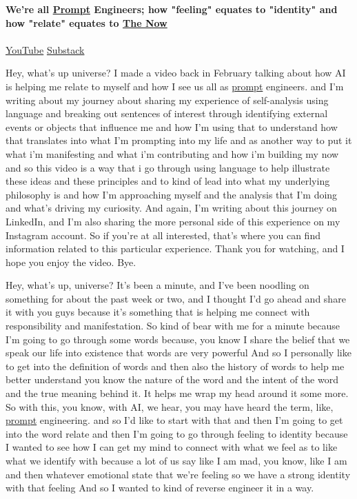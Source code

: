 \begin{nobullet}
    \item \textbf{We're all \hyperlink{gloss:prompt}{Prompt} Engineers; how "feeling" equates to "identity" and how "relate" equates to \hyperlink{gloss:the_now}{The Now}} \\\\
    \href{https://youtu.be/t0rg1TTIP9U}{\faYoutube[regular] \enskip YouTube} \qquad
    \href{https://therealzackolinger.substack.com/p/were-all-prompt-engineers?r=4jsge9}{\faNewspaper[regular] \enskip Substack}
\end{nobullet}

Hey, what's up universe? I made a video back in February talking about how AI is helping me relate to myself and how I see us all as \hyperlink{gloss:prompt}{prompt} engineers. and I'm writing about my journey about sharing my experience of self-analysis using language and breaking out sentences of interest through identifying external events or objects that influence me and how I'm using that to understand how that translates into what I'm prompting into my life and as another way to put it what i'm manifesting and what i'm contributing and how i'm building my now and so this video is a way that i go through using language to help illustrate these ideas and these principles and to kind of lead into what my underlying philosophy is and how I'm approaching myself and the analysis that I'm doing and what's driving my curiosity. And again, I'm writing about this journey on LinkedIn, and I'm also sharing the more personal side of this experience on my Instagram account. So if you're at all interested, that's where you can find information related to this particular experience. Thank you for watching, and I hope you enjoy the video. Bye. 

Hey, what's up, universe? It's been a minute, and I've been noodling on something for about the past week or two, and I thought I'd go ahead and share it with you guys because it's something that is helping me connect with responsibility and manifestation. So kind of bear with me for a minute because I'm going to go through some words because, you know I share the belief that we speak our life into existence that words are very powerful And so I personally like to get into the definition of words and then also the history of words to help me better understand you know the nature of the word and the intent of the word and the true meaning behind it. It helps me wrap my head around it some more. So with this, you know, with AI, we hear, you may have heard the term, like, \hyperlink{gloss:prompt}{prompt} engineering. and so I'd like to start with that and then I'm going to get into the word relate and then I'm going to go through feeling to identity because I wanted to see how I can get my mind to connect with what we feel as to like what we identify with because a lot of us say like I am mad, you know, like I am and then whatever emotional state that we're feeling so we have a strong identity with that feeling And so I wanted to kind of reverse engineer it in a way. 

